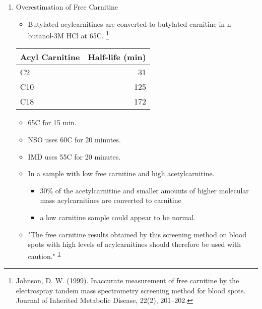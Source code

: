 \documentclass{scrartcl}
\begin{document}
\begin{enumerate}
\item Overestimation of Free Carnitine
\label{sec:orga0f51da}

\begin{itemize}
\item Butylated acylcarnitines are converted to butylated carnitine in
n-butanol-3M HCl at 65\degree{}C. \footnote{Johnson, D. W. (1999). Inaccurate measurement of free
carnitine by the electrospray tandem mass spectrometry screening
method for blood spots. Journal of Inherited Metabolic Disease, 22(2),
201–202.\label{org93e7a15}}
\end{itemize}

\begin{center}
\begin{tabular}{lr}
Acyl Carnitine & Half-life (min)\\
\hline
C2 & 31\\
C10 & 125\\
C18 & 172\\
\end{tabular}
\end{center}

\begin{itemize}
\item 65\degree{}C for 15 min.
\item NSO uses 60\degree{}C for 20 minutes.
\item IMD uses 55\degree{}C for 20 minutes.

\item In a sample with low free carnitine and high acetylcarnitine.
\begin{itemize}
\item 30\% of the acetylcarnitine and smaller amounts of higher
molecular mass acylcarnitines are converted to carnitine
\item a low carnitine sample could appear to be normal.
\end{itemize}
\item "The free carnitine results obtained by this screening method on
blood spots with high levels of acylcarnitines should therefore be
used with caution." \textsuperscript{\ref{org93e7a15}}
\end{itemize}


\end{enumerate}
\end{document}
